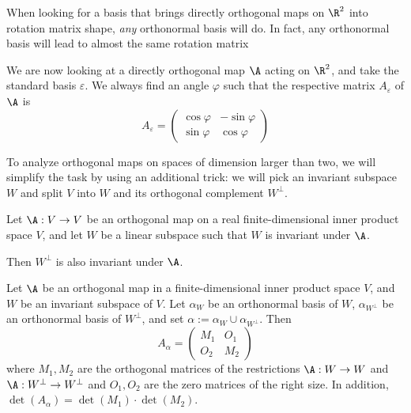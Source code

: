 \begin{remark}
    When looking for a basis that brings directly orthogonal maps on $\R^2$ into rotation matrix shape, \emph{any} 
    orthonormal basis will do. In fact, any orthonormal basis will lead to almost the same rotation matrix
\end{remark}

\begin{remark}
    We are now looking at a directly orthogonal map $\A$ acting on $\R^2$, and take the standard basis $\varepsilon$.
    We always find an angle $\varphi$ such that the respective matrix $A_\varepsilon$ of $\A$ is
    $$A_\varepsilon = \begin{pmatrix} \cos{\varphi} & -\sin{\varphi} \\ \sin{\varphi} & \cos{\varphi} \end{pmatrix}$$
\end{remark}

To analyze orthogonal maps on spaces of dimension larger than two, we will simplify the task by using an additional trick:
we will pick an invariant subspace $W$ and split $V$ into $W$ and its orthogonal complement $W^\perp$.

\begin{theorem}
    Let $\A: V \to V$ be an orthogonal map on a real finite-dimensional inner product space $V$, and let $W$ be a 
    linear subspace such that $W$ is invariant under $\A$.
    
    Then $W^\perp$ is also invariant under $\A$.
\end{theorem}

\begin{theorem}
    Let $\A$ be an orthogonal map in a finite-dimensional inner product space $V$, and $W$ be an invariant subspace of $V$.
    Let $\alpha_W$ be an orthonormal basis of $W$, $\alpha_{W^\perp}$ be an orthonormal basis of $W^\perp$, and
    set $\alpha := \alpha_W \cup \alpha_{W^\perp}$. Then
    $$A_\alpha = \begin{pmatrix}M_1 & O_1 \\ O_2 & M_2 \end{pmatrix}$$
    where $M_1,M_2$ are the orthogonal matrices of the restrictions $\A: W \to W$ and $\A: W^\perp \to W^\perp$ and 
    $O_1,O_2$ are the zero matrices of the right size. In addition, $\det(A_\alpha) = \det(M_1)\cdot\det(M_2)$.
\end{theorem}


